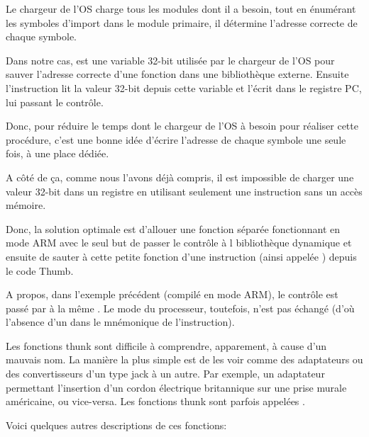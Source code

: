 Le chargeur de l'\ac{OS} charge tous les modules dont il a besoin, tout en énumérant
les symboles d'import dans le module primaire, il détermine l'adresse correcte de
chaque symbole.

Dans notre cas,  est une variable 32-bit utilisée par le
chargeur de l'\ac{OS} pour sauver l'adresse correcte d'une fonction dans une
bibliothèque externe.
Ensuite l'instruction  lit la valeur 32-bit depuis cette variable et
l'écrit dans le registre \ac{PC}, lui passant le contrôle.

Donc, pour réduire le temps dont le chargeur de l'\ac{OS} à besoin pour réaliser
cette procédure, c'est une bonne idée d'écrire l'adresse de chaque symbole une
seule fois, à une place dédiée.


A côté de ça, comme nous l'avons déjà compris, il est impossible de charger
une valeur 32-bit dans un registre en utilisant seulement une instruction
sans un accès mémoire.

Donc, la solution optimale est d'allouer une fonction séparée fonctionnant en
mode ARM avec le seul but de passer le contrôle à l bibliothèque dynamique et
ensuite de sauter à cette petite fonction d'une instruction (ainsi appelée
) depuis le code Thumb.

A propos, dans l'exemple précédent (compilé en mode ARM), le contrôle est
passé par  à la même .
Le mode du processeur, toutefois, n'est pas échangé (d'où l'absence d'un 
dans le mnémonique de l'instruction).


Les fonctions thunk sont difficile à comprendre, apparement, à cause d'un
mauvais nom.
La manière la plus simple est de les voir comme des adaptateurs ou des
convertisseurs d'un type jack à un autre.
Par exemple, un adaptateur permettant l'insertion d'un cordon électrique
britannique sur une prise murale américaine, ou vice-versa.
Les fonctions thunk sont parfois appelées .

Voici quelques autres descriptions de ces fonctions:

